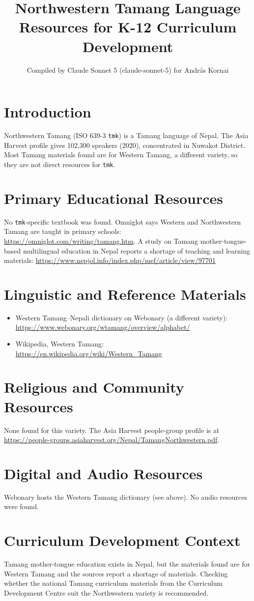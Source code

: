 \documentclass[12pt]{article}
\title{Northwestern Tamang Language Resources for K-12 Curriculum Development}
\author{Compiled by Claude Sonnet 5 (claude-sonnet-5) for Andr\'as Kornai}
\date{}
\begin{document}
\maketitle

\section{Introduction}
Northwestern Tamang (ISO 639-3 \texttt{tmk}) is a Tamang language of Nepal. The Asia Harvest profile gives 102,300 speakers (2020), concentrated in Nuwakot District. Most Tamang materials found are for Western Tamang, a different variety, so they are not direct resources for \texttt{tmk}.

\section{Primary Educational Resources}
No \texttt{tmk}-specific textbook was found. Omniglot says Western and Northwestern Tamang are taught in primary schools: \url{https://omniglot.com/writing/tamang.htm}. A study on Tamang mother-tongue-based multilingual education in Nepal reports a shortage of teaching and learning materials: \url{https://www.nepjol.info/index.php/mef/article/view/97701}

\section{Linguistic and Reference Materials}
\begin{itemize}
\item Western Tamang--Nepali dictionary on Webonary (a different variety): \url{https://www.webonary.org/wtamang/overview/alphabet/}
\item Wikipedia, Western Tamang: \url{https://en.wikipedia.org/wiki/Western_Tamang}
\end{itemize}

\section{Religious and Community Resources}
None found for this variety. The Asia Harvest people-group profile is at \url{https://people-groups.asiaharvest.org/Nepal/TamangNorthwestern.pdf}.

\section{Digital and Audio Resources}
Webonary hosts the Western Tamang dictionary (see above). No audio resources were found.

\section{Curriculum Development Context}
Tamang mother-tongue education exists in Nepal, but the materials found are for Western Tamang and the sources report a shortage of materials. Checking whether the national Tamang curriculum materials from the Curriculum Development Centre suit the Northwestern variety is recommended.
\end{document}
